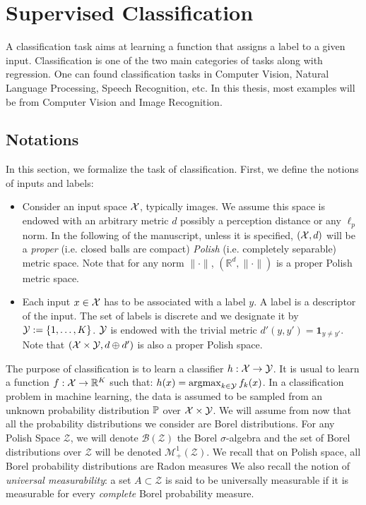 \section{Supervised Classification}
A classification task aims at learning a function that assigns a label to a given input. Classification is one of the two main categories of tasks along with regression. One can found classification tasks in Computer Vision, Natural Language Processing, Speech Recognition, etc. In this thesis, most examples will be from Computer Vision and Image Recognition. 
\subsection{Notations}
In this section, we formalize the task of classification. First, we define the notions of inputs and labels:
\begin{itemize}
    \item Consider an input space $\mathcal{X}$, typically images. We assume this space is endowed with an arbitrary metric $d$ possibly a perception distance or any $\ell_p$ norm. In the following of the manuscript, unless it is specified, $(\mathcal{X},d)$ will be a \textit{proper} (i.e. closed balls are compact) \textit{Polish} (i.e. completely separable) metric space. Note that for any norm $\lVert\cdot\rVert$,  $(\mathbb{R}^d,\lVert\cdot\rVert)$ is a proper Polish metric space.
    \item Each input $x\in \mathcal{X}$ has to be associated with a label $y$. A label is a descriptor of the input. The set of labels is discrete and we designate it by $\mathcal{Y}:=\{1,\dots,K\}$. $\mathcal{Y}$ is endowed with the trivial metric  $d'(y,y') = \mathbf{1}_{y\neq y'}$. Note that $(\mathcal{X}\times\mathcal{Y},d\oplus d')$ is also a proper Polish space.
\end{itemize}

The purpose of classification is to learn a classifier $h:\mathcal{X}\to\mathcal{Y}$. It is usual to learn a function $f:\mathcal{X}\to\mathbb{R}^K$ such that: $h(x) = \operatorname*{argmax}_{k\in\mathcal{Y}}f_k(x)$. In a classification problem in machine learning, the data is assumed to be sampled from an unknown probability distribution $\mathbb{P}$ over $\mathcal{X}\times\mathcal{Y}$. We will assume from now that all the probability distributions we consider are Borel distributions. For any Polish Space $\mathcal{Z}$, we will denote $\mathcal{B}(\mathcal{Z})$ the Borel $\sigma$-algebra and the set of Borel distributions over $\mathcal{Z}$  will be denoted $\mathcal{M}_+^1(\mathcal{Z})$. We recall that on Polish space, all Borel probability distributions are Radon measures We also recall the notion of \textit{universal measurability}: a set $A\subset \mathcal{Z}$ is said to be universally measurable if it is measurable for every \textit{complete} Borel probability measure.





